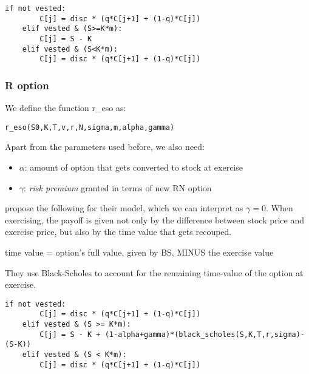  \begin{lstlisting}[breaklines, basicstyle=\ttfamily\small]
    if not vested: 
        C[j] = disc * (q*C[j+1] + (1-q)*C[j])
    elif vested & (S>=K*m):            
        C[j] = S - K
    elif vested & (S<K*m):
        C[j] = disc * (q*C[j+1] + (1-q)*C[j])
 \end{lstlisting}



\subsubsection*{R option}
We define the function r\_eso as:

\begin{lstlisting}[breaklines, basicstyle=\ttfamily\small]
    r_eso(S0,K,T,v,r,N,sigma,m,alpha,gamma)
\end{lstlisting}


Apart from the parameters used before, we also need:
\begin{itemize}
    \item $\alpha$: amount of option that gets converted to stock at exercise
    \item $\gamma$: \textit{risk premium} granted in terms of new RN option 
\end{itemize}


\cite{huang2013dynamic} propose the following for their model, which we can interpret as $\gamma = 0$. 
When exercising, the payoff is given not only by the difference between stock price and exercise price, but also by the time value that gets recouped.

time value = option's full value, given by BS, MINUS the exercise value

They use Black-Scholes to account for the remaining time-value of the option at exercise. 
\begin{lstlisting}[breaklines, basicstyle=\ttfamily\small]
    if not vested:                
        C[j] = disc * (q*C[j+1] + (1-q)*C[j])
    elif vested & (S >= K*m): 
        C[j] = S - K + (1-alpha+gamma)*(black_scholes(S,K,T,r,sigma)-(S-K))
    elif vested & (S < K*m):
        C[j] = disc * (q*C[j+1] + (1-q)*C[j])
 \end{lstlisting}





